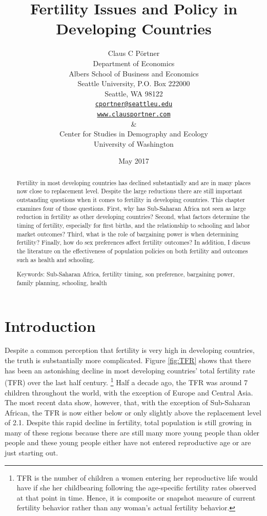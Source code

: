 \documentclass[letterpaper,12pt]{article}
\title{Fertility Issues and Policy in Developing Countries}
\author{Claus C P\"ortner\\
    Department of Economics\\
    Albers School of Business and Economics\\
    Seattle University, P.O. Box 222000\\
    Seattle, WA 98122\\
    \href{mailto:cportner@seattleu.edu}{\texttt{cportner@seattleu.edu}}\\
    \href{http://www.clausportner.com}{\texttt{www.clausportner.com}}\\
    \& \\
    Center for Studies in Demography and Ecology \\
    University of Washington\\ \vspace{2cm}
    }
\date{May 2017}
\begin{document}
\maketitle
\thispagestyle{empty}

\begin{abstract}

Fertility in most developing countries has declined substantially 
and are in many places now close to replacement level.
Despite the large reductions there are still important outstanding 
questions when it comes to fertility in developing countries.
This chapter examines four of those questions.
First, why has Sub-Saharan Africa not seen as large reduction in 
fertility as other developing countries?
Second, what factors determine the timing of fertility, especially
for first births, and the relationship to schooling and labor
market outcomes?
Third, what is the role of bargaining power is when determining
fertility?
Finally, how do sex preferences affect fertility outcomes?
In addition, I discuss the literature on the effectiveness 
of population policies on both fertility and outcomes such
as health and schooling.

\noindent Keywords: Sub-Saharan Africa, fertility timing, son preference, 
bargaining power, family planning, schooling, health

\end{abstract}

\newpage 

\doublespacing

\section{Introduction}

Despite a common perception that fertility is very high in developing
countries, the truth is substantially more complicated.
Figure \ref{fig:TFR} shows that there has been an astonishing decline in
most developing countries' total fertility rate (TFR) over the last half
century.%
\footnote{
TFR is the number of children a women entering her reproductive life
would have if she her childbearing following the age-specific fertility
rates observed at that point in time.
Hence, it is composite or snapshot measure of current fertility
behavior rather than any woman's actual fertility behavior.}
Half a decade ago, the TFR was around 7 children throughout the world,
with the exception of Europe and Central Asia.
The most recent data show, however, that, with the exception of
Sub-Saharan African, the TFR is now either below or only slightly above
the replacement level of 2.1.
Despite this rapid decline in fertility, total population is still
growing in many of these regions because there are still many more young
people than older people and these young people either have not entered
reproductive age or are just starting out.
\end{document}
